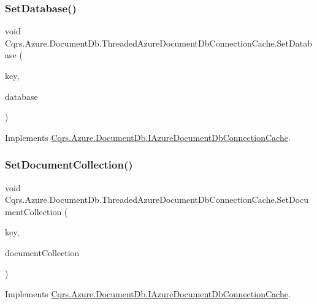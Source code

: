 \subsubsection{\texorpdfstring{Set\+Database()}{SetDatabase()}}
{\footnotesize\ttfamily void Cqrs.\+Azure.\+Document\+Db.\+Threaded\+Azure\+Document\+Db\+Connection\+Cache.\+Set\+Database (\begin{DoxyParamCaption}\item[{string}]{key,  }\item[{Database}]{database }\end{DoxyParamCaption})}



Implements \hyperlink{interfaceCqrs_1_1Azure_1_1DocumentDb_1_1IAzureDocumentDbConnectionCache_a9242c99ffb76f8ad9b15cab617056bf0_a9242c99ffb76f8ad9b15cab617056bf0}{Cqrs.\+Azure.\+Document\+Db.\+I\+Azure\+Document\+Db\+Connection\+Cache}.

\mbox{\label{classCqrs_1_1Azure_1_1DocumentDb_1_1ThreadedAzureDocumentDbConnectionCache_a069d9161ed5649cc3e65cda641d5173d_a069d9161ed5649cc3e65cda641d5173d}} 
\subsubsection{\texorpdfstring{Set\+Document\+Collection()}{SetDocumentCollection()}}
{\footnotesize\ttfamily void Cqrs.\+Azure.\+Document\+Db.\+Threaded\+Azure\+Document\+Db\+Connection\+Cache.\+Set\+Document\+Collection (\begin{DoxyParamCaption}\item[{string}]{key,  }\item[{Document\+Collection}]{document\+Collection }\end{DoxyParamCaption})}



Implements \hyperlink{interfaceCqrs_1_1Azure_1_1DocumentDb_1_1IAzureDocumentDbConnectionCache_a6f5dab93f2ebee2503eb808b9031777d_a6f5dab93f2ebee2503eb808b9031777d}{Cqrs.\+Azure.\+Document\+Db.\+I\+Azure\+Document\+Db\+Connection\+Cache}.

